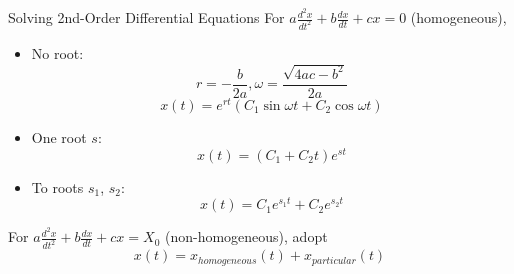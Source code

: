 \documentclass{beamer}
\begin{document}

\begin{frame}{Solving 2nd-Order Differential Equations}
For $a\frac{d^2x}{dt^2}+b\frac{dx}{dt}+cx=0$ (homogeneous),
\begin{itemize}
    \item No root:
    $$r=-\frac{b}{2a}, \omega = \frac{\sqrt{4ac-b^2}}{2a}$$
    $$x(t)=e^{rt}(C_1\sin \omega t + C_2 \cos \omega t) $$
    \item One root $s$:
    $$x(t)=(C_1+C_2t)e^{st}$$
    \item To roots $s_1$, $s_2$:
    $$x(t)=C_1e^{s_1t}+C_2e^{s_2t}$$
\end{itemize}
For $a\frac{d^2x}{dt^2}+b\frac{dx}{dt}+cx=X_0$ (non-homogeneous), adopt
$$x(t)=x_{homogeneous}(t) + x_{particular}(t)$$
\end{frame}

\end{document}
